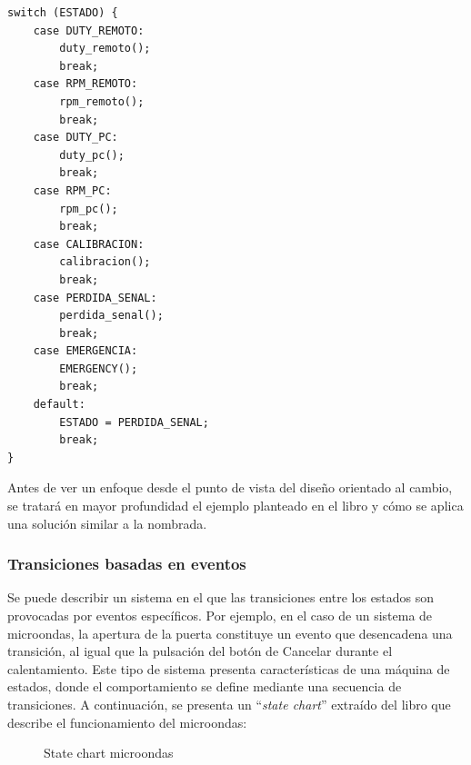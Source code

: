 \begin{lstlisting}[caption=Main loop del previo firmware del robot desmalezador, label={codigoLoopMain}]
switch (ESTADO) {
	case DUTY_REMOTO:
		duty_remoto();
		break;
	case RPM_REMOTO:
		rpm_remoto();
		break;
	case DUTY_PC:
		duty_pc();
		break;
	case RPM_PC:
		rpm_pc();
		break;	
	case CALIBRACION:
		calibracion();
		break;
	case PERDIDA_SENAL:
		perdida_senal();
		break;
	case EMERGENCIA:
		EMERGENCY();
		break;
	default:
		ESTADO = PERDIDA_SENAL;
		break;
}
\end{lstlisting}

Antes de ver un enfoque desde el punto de vista del diseño orientado al cambio, se tratará en mayor profundidad el ejemplo planteado en el libro \cite{douglass} y cómo se aplica una solución similar a la nombrada.

\subsubsection*{Transiciones basadas en eventos}
Se puede describir un sistema en el que las transiciones entre los estados son provocadas por eventos específicos. Por ejemplo, en el caso de un sistema de microondas, la apertura de la puerta constituye un evento que desencadena una transición, al igual que la pulsación del botón de Cancelar durante el calentamiento. Este tipo de sistema presenta características de una máquina de estados, donde el comportamiento se define mediante una secuencia de transiciones. A continuación, se presenta un ``\textit{state chart}'' extraído del libro que describe el funcionamiento del microondas:


\begin{figure}[h]
\caption{State chart microondas}
\begin{center}
\end{center}
\end{figure}

